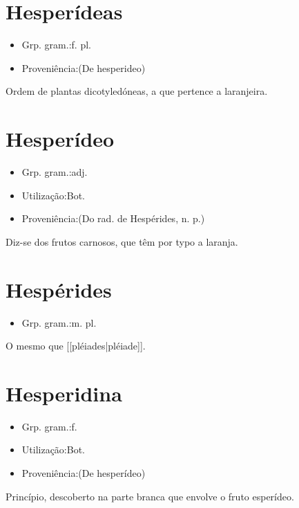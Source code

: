 \documentclass{article}
\begin{document}
\section{Hesperídeas}
\begin{itemize}
\item {Grp. gram.:f. pl.}
\end{itemize}
\begin{itemize}
\item {Proveniência:(De \textunderscore hesperideo\textunderscore )}
\end{itemize}
Ordem de plantas dicotyledóneas, a que pertence a laranjeira.
\section{Hesperídeo}
\begin{itemize}
\item {Grp. gram.:adj.}
\end{itemize}
\begin{itemize}
\item {Utilização:Bot.}
\end{itemize}
\begin{itemize}
\item {Proveniência:(Do rad. de \textunderscore Hespérides\textunderscore , n. p.)}
\end{itemize}
Diz-se dos frutos carnosos, que têm por typo a laranja.
\section{Hespérides}
\begin{itemize}
\item {Grp. gram.:m. pl.}
\end{itemize}
O mesmo que [[pléiades|pléiade]].
\section{Hesperidina}
\begin{itemize}
\item {Grp. gram.:f.}
\end{itemize}
\begin{itemize}
\item {Utilização:Bot.}
\end{itemize}
\begin{itemize}
\item {Proveniência:(De \textunderscore hesperídeo\textunderscore )}
\end{itemize}
Princípio, descoberto na parte branca que envolve o fruto esperídeo.
\end{document}
